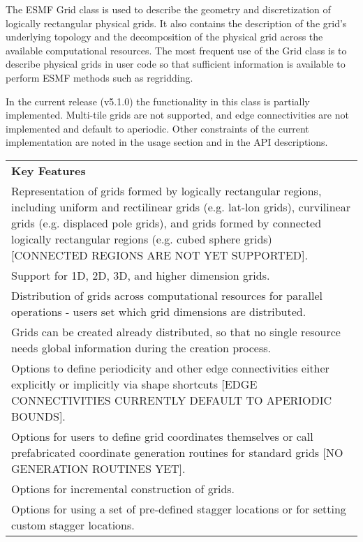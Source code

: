 %

The ESMF Grid class is used to describe the geometry and discretization
of logically rectangular physical grids.  It also contains the
description of the grid's underlying topology and the decomposition
of the physical grid across the available computational resources.
The most frequent use of the Grid class is to describe physical grids
in user code so that sufficient information is available to perform ESMF
methods such as regridding.  

In the current release (v5.1.0)
the functionality in this class is partially implemented.  
Multi-tile grids are not supported, and edge connectivities 
are not implemented and default to aperiodic.  
Other constraints of the current
implementation are noted in the usage section and in the API
descriptions.

\begin{center}
\begin{tabular}{|p{6in}|}
\hline
\vspace{.01in}
{\bf Key Features} \\[.01in]
Representation of grids formed by logically rectangular regions,
including uniform and rectilinear grids (e.g. lat-lon grids),
curvilinear grids (e.g. displaced pole grids), and grids formed
by connected logically rectangular regions (e.g. cubed sphere grids)
[CONNECTED REGIONS ARE NOT YET SUPPORTED].\\
Support for 1D, 2D, 3D, and higher dimension grids.\\ 
Distribution of grids across computational resources for parallel
operations - users set which grid dimensions are distributed.\\
Grids can be created already distributed, so that no single
resource needs global information during the creation process.\\
Options to define periodicity and other edge connectivities either 
explicitly or implicitly via shape shortcuts [EDGE CONNECTIVITIES
CURRENTLY DEFAULT TO APERIODIC BOUNDS].\\ 
Options for users to define grid coordinates themselves or call
prefabricated coordinate generation routines for standard grids
[NO GENERATION ROUTINES YET].\\
Options for incremental construction of grids.\\
Options for using a set of pre-defined stagger locations or for setting
custom stagger locations.\\ [.03in] \hline
\end{tabular}
\end{center}

